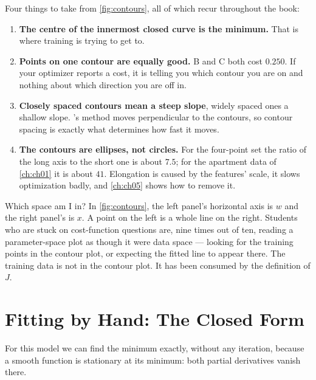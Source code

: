 Four things to take from \cref{fig:contours}, all of which recur throughout the
book:

\begin{enumerate}
  \item \textbf{The centre of the innermost closed curve is the minimum.} That
        is where training is trying to get to.
  \item \textbf{Points on one contour are equally good.} B and C both cost
        $0.250$. If your optimizer reports a cost, it is telling you which
        contour you are on and nothing about which direction you are off in.
  \item \textbf{Closely spaced contours mean a steep slope}, widely spaced ones a
        shallow slope. 's method moves perpendicular to the
        contours, so contour spacing is exactly what determines how fast it
        moves.
  \item \textbf{The contours are ellipses, not circles.} For the four-point set
        the ratio of the long axis to the short one is about $7.5$; for the
        apartment data of \cref{ch:ch01} it is about $41$. Elongation is caused
        by the features' scale, it slows optimization badly, and
        \cref{ch:ch05} shows how to remove it.
\end{enumerate}

\begin{pitfall}{Which space am I in?}
In \cref{fig:contours}, the left panel's horizontal axis is $w$ and the right
panel's is $x$. A point on the left is a whole line on the right. Students who
are stuck on cost-function questions are, nine times out of ten, reading a
parameter-space plot as though it were data space --- looking for the training
points in the contour plot, or expecting the fitted line to appear there. The
training data is not in the contour plot. It has been consumed by the definition
of $J$.
\end{pitfall}

\section{Fitting by Hand: The Closed Form}
\label{sec:closed-form}

For this model we can find the minimum exactly, without any iteration, because a
smooth function is stationary at its minimum: both partial derivatives vanish
there.

